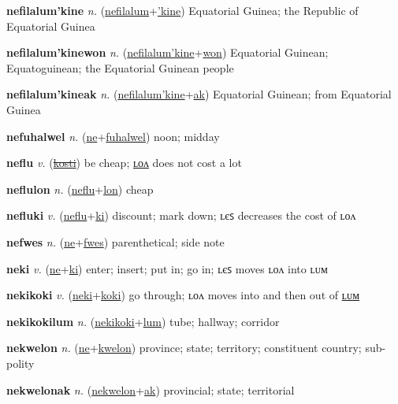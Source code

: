 \textbf{\hypertarget{nefilalum'kine}{nefilalum'kine}} \textit{n.} (\hyperlink{nefilalum}{nefilalum}+\allowbreak \hyperlink{'kine}{'kine})
Equatorial Guinea; the Republic of Equatorial Guinea

\textbf{\hypertarget{nefilalum'kinewon}{nefilalum'kinewon}} \textit{n.} (\hyperlink{nefilalum'kine}{nefilalum'kine}+\allowbreak \hyperlink{won}{won})
Equatorial Guinean; Equatoguinean; the Equatorial Guinean people

\textbf{\hypertarget{nefilalum'kineak}{nefilalum'kineak}} \textit{n.} (\hyperlink{nefilalum'kine}{nefilalum'kine}+\allowbreak \hyperlink{ak}{ak})
Equatorial Guinean; from Equatorial Guinea

\textbf{\hypertarget{nefuhalwel}{nefuhalwel}} \textit{n.} (\hyperlink{ne}{ne}+\allowbreak \hyperlink{fuhalwel}{fuhalwel})
noon; midday

\textbf{\hypertarget{neflu}{neflu}} \textit{v.} (\hyperlink{kosti}{\sout{kosti}})
be cheap; \hyperlink{neflulon}{ʟᴏᴧ} does not cost a lot

\textbf{\hypertarget{neflulon}{neflulon}} \textit{n.} (\hyperlink{neflu}{neflu}+\allowbreak \hyperlink{lon}{lon})
cheap

\textbf{\hypertarget{nefluki}{nefluki}} \textit{v.} (\hyperlink{neflu}{neflu}+\allowbreak \hyperlink{ki}{ki})
discount; mark down; ʟєꜱ decreases the cost of ʟᴏᴧ

\textbf{\hypertarget{nefwes}{nefwes}} \textit{n.} (\hyperlink{ne}{ne}+\allowbreak \hyperlink{fwes}{fwes})
parenthetical; side note

\textbf{\hypertarget{neki}{neki}} \textit{v.} (\hyperlink{ne}{ne}+\allowbreak \hyperlink{ki}{ki})
enter; insert; put in; go in; ʟєꜱ moves ʟᴏᴧ into ʟᴜᴍ

\textbf{\hypertarget{nekikoki}{nekikoki}} \textit{v.} (\hyperlink{neki}{neki}+\allowbreak \hyperlink{koki}{koki})
go through; ʟᴏᴧ moves into and then out of \hyperlink{nekikokilum}{ʟᴜᴍ}

\textbf{\hypertarget{nekikokilum}{nekikokilum}} \textit{n.} (\hyperlink{nekikoki}{nekikoki}+\allowbreak \hyperlink{lum}{lum})
tube; hallway; corridor

\textbf{\hypertarget{nekwelon}{nekwelon}} \textit{n.} (\hyperlink{ne}{ne}+\allowbreak \hyperlink{kwelon}{kwelon})
province; state; territory; constituent country; sub-polity

\textbf{\hypertarget{nekwelonak}{nekwelonak}} \textit{n.} (\hyperlink{nekwelon}{nekwelon}+\allowbreak \hyperlink{ak}{ak})
provincial; state; territorial

